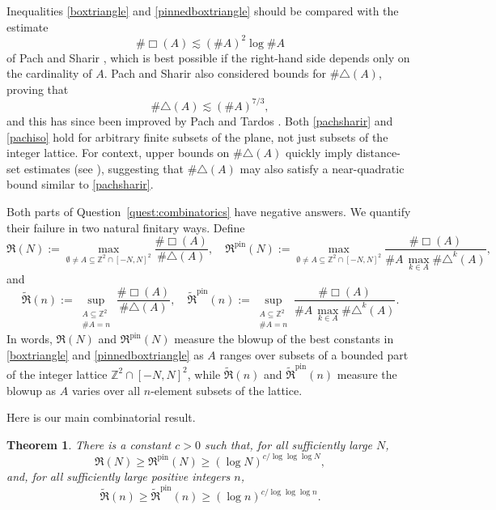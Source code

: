 \documentclass[11pt,reqno]{amsart}
\newtheorem{theorem}{Theorem}[section]
\numberwithin{equation}{section}
\renewcommand{\geq}{\geqslant}
\begin{document}
Inequalities \eqref{boxtriangle} and \eqref{pinnedboxtriangle} should be compared with the estimate
\begin{equation}\label{pachsharir}
\#\Box(A)\lesssim (\#A)^2\log\#A
\end{equation}
of Pach and Sharir \cite{PachSharir}, which is best possible if the right-hand side depends only on the cardinality of $A$. Pach and Sharir also considered bounds for $\#\triangle(A)$, proving that
\begin{equation}\label{pachiso}
\#\triangle(A)\lesssim (\#A)^{7/3},
\end{equation}
and this has since been improved by Pach and Tardos \cite{PachTardos}. Both \eqref{pachsharir} and \eqref{pachiso} hold for arbitrary finite subsets of the plane, not just subsets of the integer lattice. For context, upper bounds on $\#\triangle(A)$ quickly imply distance-set estimates (see \cite{PachSharir,PachTardos, TV}), suggesting that $\#\triangle(A)$ may also satisfy a near-quadratic bound similar to \eqref{pachsharir}.

Both parts of Question~\ref{quest:combinatorics} have negative answers. We quantify their failure in two natural finitary ways. Define
\[ \mathfrak{R}(N) := \max_{\emptyset\ne A\subseteq\mathbb{Z}^2\cap[-N,N]^2} \frac{\#\Box(A)}{\#\triangle(A)},
\quad \mathfrak{R}^{\mathrm{pin}}(N) := \max_{\emptyset\ne A\subseteq\mathbb{Z}^2\cap[-N,N]^2} \frac{\#\Box(A)}{\#A\, \max_{k\in A}\limits \#\triangle^k(A)}, \]
and
\[ \widetilde{\mathfrak{R}}(n) := \sup_{\substack{A\subseteq\mathbb{Z}^2\\ \#A=n}} \frac{\#\Box(A)}{\#\triangle(A)},
\quad \widetilde{\mathfrak{R}}^{\mathrm{pin}}(n) := \sup_{\substack{A\subseteq\mathbb{Z}^2\\ \#A=n}} \frac{\#\Box(A)}{\#A\, \max_{k\in A}\limits \#\triangle^k(A)}. \]
In words, $\mathfrak{R}(N)$ and $\mathfrak{R}^{\mathrm{pin}}(N)$ measure the blowup of the best constants in \eqref{boxtriangle} and \eqref{pinnedboxtriangle} as $A$ ranges over subsets of a bounded part of the integer lattice $\mathbb{Z}^2\cap[-N,N]^2$, while $\widetilde{\mathfrak{R}}(n)$ and $\widetilde{\mathfrak{R}}^{\mathrm{pin}}(n)$ measure the blowup as $A$ varies over all $n$-element subsets of the lattice.

Here is our main combinatorial result.

\begin{theorem}\label{thm:combinatorics}
There is a constant $c>0$ such that, for all sufficiently large $N$,
\[ \mathfrak{R}(N) \geq \mathfrak{R}^{\mathrm{pin}}(N) \geq (\log N)^{c/\log\log\log N}, \]
and, for all sufficiently large positive integers $n$,
\[ \widetilde{\mathfrak{R}}(n) \geq \widetilde{\mathfrak{R}}^{\mathrm{pin}}(n) \geq (\log n)^{c/\log\log\log n}. \]
\end{theorem}
\end{document}
